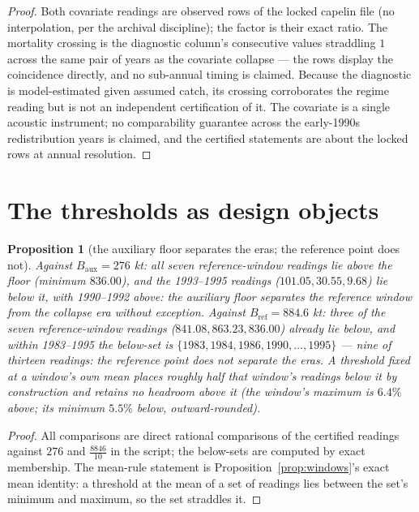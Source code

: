 \documentclass[10pt,twocolumn]{article}
\theoremstyle{plain}
\newtheorem{proposition}[theorem]{Proposition}
\theoremstyle{remark}
\begin{document}
\begin{proof}
Both covariate readings are observed rows of the locked capelin file
(no interpolation, per the archival discipline); the factor is their
exact ratio. The mortality crossing is the diagnostic column's
consecutive values straddling \(1\) across the same pair of years as
the covariate collapse --- the rows display the coincidence directly,
and no sub-annual timing is claimed. Because the diagnostic is
model-estimated given assumed catch, its crossing corroborates the
regime reading but is not an independent certification of it. The
covariate is a single acoustic instrument; no comparability guarantee
across the early-1990s redistribution years is claimed, and the
certified statements are about the locked rows at annual resolution.
\end{proof}

\section{The thresholds as design objects}\label{design}

\begin{proposition}[the auxiliary floor separates the eras; the
reference point does not]\label{prop:discrimination}
Against \(B_{\mathrm{aux}} = 276\) kt: all seven reference-window
readings lie above the floor (minimum \(836.00\)), and the 1993--1995
readings (\(101.05, 30.55, 9.68\)) lie below it, with 1990--1992
above: the auxiliary floor separates the reference window from the
collapse era without exception. Against
\(B_{\mathrm{ref}} = 884.6\) kt: three of the seven reference-window
readings (\(841.08, 863.23, 836.00\)) already lie below, and within
1983--1995 the below-set is \(\{1983, 1984, 1986, 1990, \dots, 1995\}\)
--- nine of thirteen readings: the reference point does not separate
the eras. A threshold fixed at a window's own mean places roughly half
that window's readings below it by construction and retains no
headroom above it (the window's maximum is \(6.4\%\) above; its
minimum \(5.5\%\) below, outward-rounded).
\end{proposition}

\begin{proof}
All comparisons are direct rational comparisons of the certified
readings against \(276\) and \(\tfrac{8846}{10}\) in the script; the
below-sets are computed by exact membership. The mean-rule statement
is Proposition~\ref{prop:windows}'s exact mean identity: a threshold
at the mean of a set of readings lies between the set's minimum and
maximum, so the set straddles it.
\end{proof}
\end{document}
